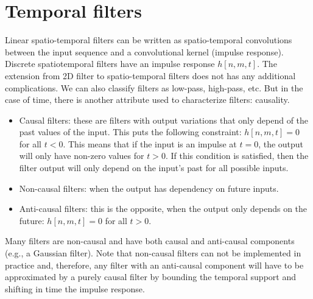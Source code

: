 \section{Temporal filters}

Linear spatio-temporal filters can be written as spatio-temporal convolutions between the input sequence and a convolutional kernel (impulse response). Discrete spatiotemporal filters have an impulse response $h \left[n,m,t \right]$. The extension from 2D filter to spatio-temporal filters does not has any additional complications. We can also classify filters as low-pass, high-pass, etc. But in the case of time, there is another attribute used to characterize filters: causality. 
\begin{itemize} 
\item Causal filters: these are filters with output variations that only depend of the past values of the input. This puts the following constraint: $h \left[n,m,t \right]=0$ for all $t<0$. This means that if the input is an impulse at $t=0$, the output will only have non-zero values for $t>0$. If this condition is satisfied, then the filter output will only depend on the input's past for all possible inputs. 
\item Non-causal filters: when the output has dependency on future inputs.
\item Anti-causal filters: this is the opposite, when the output only depends on the future: $h \left[n,m,t \right]=0$ for all $t>0$.
\end{itemize}
Many filters are non-causal and have both causal and anti-causal components (e.g., a Gaussian filter). Note that non-causal filters can not be implemented in practice and, therefore, any filter with an anti-causal component will have to be approximated by a purely causal filter by bounding the temporal support and shifting in time the impulse response. 

